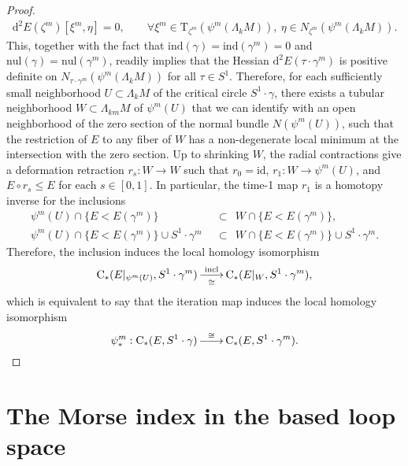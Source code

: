 \documentclass[reqno]{amsart}
\numberwithin{equation}{section}
\theoremstyle{personal}%
\theoremstyle{definition}
\newcommand{\diff}{\mathrm{d}}
\newcommand{\incl}{\mathrm{incl}}
\newcommand{\Tan}{\mathrm{T}}
\newcommand{\Loc}{\mathrm{C}}
\newcommand{\ind}{\mathrm{ind}}
\newcommand{\nul}{\mathrm{nul}}
\DeclareRobustCommand{\llongrightarrow}{\relbar\joinrel\relbar\joinrel\rightarrow}
\DeclareMathOperator*{\ttoup}{\llongrightarrow}
\begin{document}
\begin{proof}
\begin{align*}
 \diff^2E(\zeta^m)[\xi^m,\eta]=0,
 \qquad
 \forall\xi^m\in\Tan_{\zeta^m}(\psi^m(\Lambda_kM)),\ \eta\in N_{\zeta^m}(\psi^m(\Lambda_kM)).
\end{align*}
This, together with the fact that $\ind(\gamma)=\ind(\gamma^m)=0$ and $\nul(\gamma)=\nul(\gamma^m)$, readily implies that the Hessian $\diff^2E(\tau\cdot\gamma^m)$ is positive definite on $N_{\tau\cdot\gamma^m}(\psi^m(\Lambda_kM))$ for all $\tau\in S^1$. Therefore, for each sufficiently small neighborhood $U\subset \Lambda_kM$ of the critical circle $S^1\cdot\gamma$, there exists a tubular neighborhood $W\subset \Lambda_{km}M$ of $\psi^m(U)$ that we can identify with an open neighborhood of the zero section of the normal bundle $N(\psi^m(U))$, such that the restriction of $E$ to any fiber of $W$ has a non-degenerate local minimum at the intersection with the zero section. Up to shrinking $W$, the radial contractions give a deformation retraction $r_s:W\to W$ such that $r_0=\mathrm{id}$, $r_1:W\to\psi^m(U)$, and $E\circ r_s\leq E$ for each $s\in[0,1]$. In particular, the time-1 map $r_1$ is a homotopy inverse for the inclusions
\begin{align*}
\psi^m(U)\cap\{E<E(\gamma^m)\}& \ \  \subset \ \ W\cap\{E<E(\gamma^m)\}, \\
\psi^m(U)\cap\{E<E(\gamma^m)\}\cup S^1\cdot\gamma^m& \ \ \subset \ \ W\cap\{E<E(\gamma^m)\}\cup S^1\cdot\gamma^m.
\end{align*}
Therefore, the inclusion induces the local homology isomorphism
\begin{align*}
\Loc_*(E|_{\psi^m(U)},S^1\cdot\gamma^m) \ttoup^{\incl}_{\cong}
\Loc_*(E|_{W},S^1\cdot\gamma^m),
\end{align*}
which is equivalent to say that the iteration map induces the 
local homology isomorphism
\[
\psi^m_*:\Loc_*(E,S^1\cdot\gamma) \ttoup^{\cong}
\Loc_*(E,S^1\cdot\gamma^m).
\qedhere
\]
\end{proof}


\section{The Morse index in the based loop space}
\label{s:idx_based}
\end{document}
